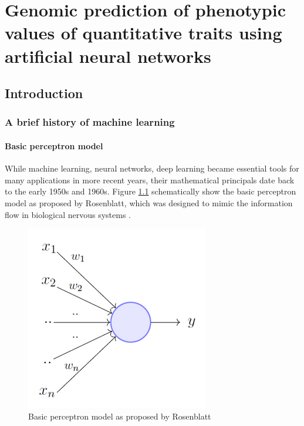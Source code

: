 \chapter{Genomic prediction of phenotypic values of quantitative traits using artificial neural networks}

\label{Chapter3} %




\section{Introduction}
\subsection{A brief history of machine learning} \label{introml}
\subsubsection{Basic perceptron model}

While machine learning, neural networks, deep learning became essential tools for many applications in more
recent years, their mathematical principals date back to the early 1950s and 1960s. Figure
\ref{fig:perceptron} schematically show the basic perceptron model as proposed by Rosenblatt, which was
designed to mimic the information flow in biological nervous systems \cite{rosenblatt1961}.

\begin{figure}[th]
 \centering \includegraphics[height=.25\textheight, width=.5\textwidth]{Figures/perceptron.png} \decoRule
\caption[Basic perceptron model]{Basic perceptron model as proposed by Rosenblatt}
\label{fig:perceptron}
\end{figure}

